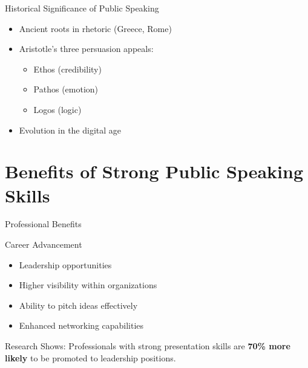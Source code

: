 \documentclass{beamer}
\begin{document}
\begin{frame}{Historical Significance of Public Speaking}
    \begin{itemize}
        \item Ancient roots in rhetoric (Greece, Rome)
        \item Aristotle's three persuasion appeals:
            \begin{itemize}
                \item Ethos (credibility)
                \item Pathos (emotion)
                \item Logos (logic)
            \end{itemize}
        \item Evolution in the digital age
    \end{itemize}
    
    \vspace{0.5cm}
    \begin{center}
    \end{center}
\end{frame}

\section{Benefits of Strong Public Speaking Skills}

\begin{frame}{Professional Benefits}
    \begin{block}{Career Advancement}
        \begin{itemize}
            \item Leadership opportunities
            \item Higher visibility within organizations
            \item Ability to pitch ideas effectively
            \item Enhanced networking capabilities
        \end{itemize}
    \end{block}
    
    \begin{alertblock}{Research Shows:}
        \centering
        Professionals with strong presentation skills are \textbf{70\% more likely} to be promoted to leadership positions.
    \end{alertblock}
\end{frame}
\end{document}
